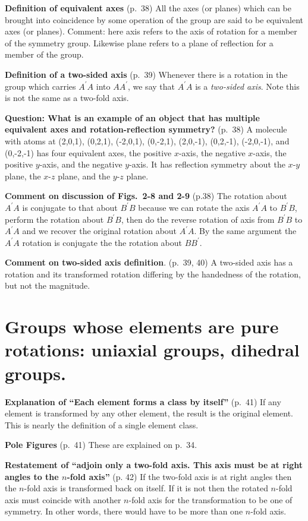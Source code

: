 {\bf Definition of equivalent axes} (p.\ 38) All the axes (or planes)
which can be brought into coincidence by some operation of the group
are said to be equivalent axes (or planes). Comment: here axis refers
to the axis of rotation for a member of the symmetry group. Likewise
plane refers to a plane of reflection for a member of the group.

{\bf Definition of a two-sided axis} (p.\ 39) Whenever there is a
rotation in the group which carries $A^\prime A$ into $AA^\prime$, we
say that $A^\prime A$ is a {\it two-sided axis}. Note this is not the
same as a two-fold axis.

{\bf Question: What is an example of an object that has multiple
  equivalent axes and rotation-reflection symmetry?} (p.\ 38) A
molecule with atoms at (2,0,1), (0,2,1), (-2,0,1), (0,-2,1), (2,0,-1),
(0,2,-1), (-2,0,-1), and (0,-2,-1) has four equivalent axes, the
positive $x$-axis, the negative $x$-axis, the positive $y$-axis, and
the negative $y$-axis. It has reflection symmetry about the $x$-$y$
plane, the $x$-$z$ plane, and the $y$-$z$ plane.

{\bf Comment on discussion of Figs.\ 2-8 and 2-9} (p.38) The rotation
about $A^\prime A$ is conjugate to that about $B^\prime B$ because we
can rotate the axis $A^\prime A$ to $B^\prime B$, perform the rotation
about $B^\prime B$, then do the reverse rotation of axis from
$B^\prime B$ to $A^\prime A$ and we recover the original rotation
about $A^\prime A$. By the same argument the $A^\prime A$ rotation is
conjugate the the rotation about $BB^\prime$.

{\bf Comment on two-sided axis definition}. (p.\ 39, 40) A two-sided
axis has a rotation and its transformed rotation differing by the
handedness of the rotation, but not the magnitude.

\section[Pure rotations: uniaxial groups, dihedral groups]{Groups whose elements are pure rotations: uniaxial groups, dihedral groups.}

{\bf Explanation of ``Each element forms a class by itself''} (p.\ 41)
If any element is transformed by any other element, the result is the
original element. This is nearly the definition of a single element class.

{\bf Pole Figures} (p.\ 41) These are explained on p.\ 34.

{\bf Restatement of ``adjoin only a two-fold axis. This axis must be
  at right angles to the $n$-fold axis''} (p. 42) If the two-fold axis
is at right angles then the $n$-fold axis is transformed back on
itself. If it is not then the rotated $n$-fold axis must coincide with
another $n$-fold axis for the transformation to be one of symmetry. In
other words, there would have to be more than one $n$-fold axis.

